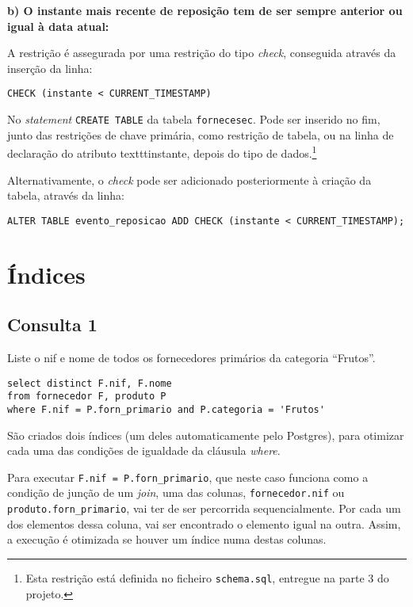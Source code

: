 \documentclass[12pt]{extarticle}
\begin{document}
\bigskip
\noindent\textbf{b) O instante mais recente de reposição tem de ser sempre anterior ou igual à data atual:}\par

\noindent A restrição é assegurada por uma restrição do tipo \textit{check}, conseguida através da inserção da linha:\par

\begin{lstlisting}
CHECK (instante < CURRENT_TIMESTAMP)
\end{lstlisting}

\noindent No \textit{statement} \texttt{CREATE TABLE} da tabela \texttt{fornece\textunderscore sec}. Pode ser inserido no fim, junto das restrições de chave primária, como restrição de tabela, ou na linha de declaração do atributo texttt{instante}, depois do tipo de dados.\footnote{Esta restrição está definida no ficheiro \texttt{schema.sql}, entregue na parte 3 do projeto.}\par

Alternativamente, o \textit{check} pode ser adicionado posteriormente à criação da tabela, através da linha:

\begin{lstlisting}
ALTER TABLE evento_reposicao ADD CHECK (instante < CURRENT_TIMESTAMP);
\end{lstlisting}

\section{Índices}
\subsection{Consulta 1}
Liste o nif e nome de todos os fornecedores primários da categoria “Frutos”.

\begin{lstlisting}
select distinct F.nif, F.nome
from fornecedor F, produto P
where F.nif = P.forn_primario and P.categoria = 'Frutos'
\end{lstlisting}
\medskip

\noindent São criados dois índices (um deles automaticamente pelo Postgres), para otimizar cada uma das condições de igualdade da cláusula \textit{where}.\par

Para executar \texttt{F.nif = P.forn\_primario}, que neste caso funciona como a condição de junção de um \textit{join}, uma das colunas, \texttt{fornecedor.nif} ou \texttt{produto.forn\_primario}, vai ter de ser percorrida sequencialmente. Por cada um dos elementos dessa coluna, vai ser encontrado o elemento igual na outra. Assim, a execução é otimizada se houver um índice numa destas colunas.\par
\end{document}
